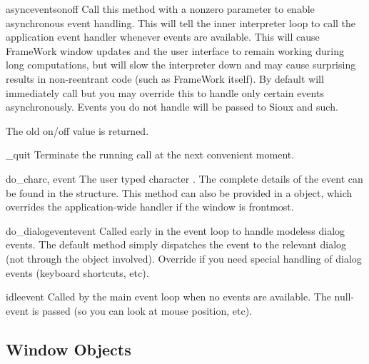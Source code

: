 \begin{methoddesc}[Application]{asyncevents}{onoff}
Call this method with a nonzero parameter to enable
asynchronous event handling. This will tell the inner interpreter loop
to call the application event handler  whenever events
are available. This will cause FrameWork window updates and the user
interface to remain working during long computations, but will slow the
interpreter down and may cause surprising results in non-reentrant code
(such as FrameWork itself). By default  will immediately
call  but you may override this to handle only certain
events asynchronously. Events you do not handle will be passed to Sioux
and such.

The old on/off value is returned.
\end{methoddesc}

\begin{methoddesc}[Application]{_quit}{}
Terminate the running  call at the next convenient
moment.
\end{methoddesc}

\begin{methoddesc}[Application]{do_char}{c, event}
The user typed character . The complete details of the event
can be found in the  structure. This method can also be
provided in a  object, which overrides the
application-wide handler if the window is frontmost.
\end{methoddesc}

\begin{methoddesc}[Application]{do_dialogevent}{event}
Called early in the event loop to handle modeless dialog events. The
default method simply dispatches the event to the relevant dialog (not
through the  object involved). Override if you
need special handling of dialog events (keyboard shortcuts, etc).
\end{methoddesc}

\begin{methoddesc}[Application]{idle}{event}
Called by the main event loop when no events are available. The
null-event is passed (so you can look at mouse position, etc).
\end{methoddesc}


\subsection{Window Objects \label{window-objects}}

